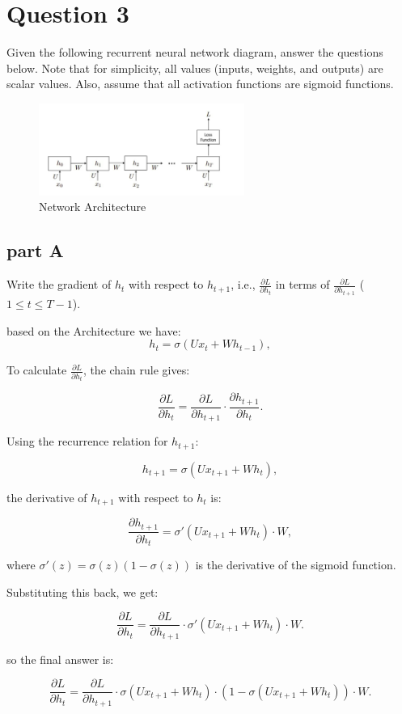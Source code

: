 \section{Question 3}

Given the following recurrent neural network diagram, answer the questions below. Note that for simplicity, all values (inputs, weights, and outputs) are scalar values. Also, assume that all activation functions are sigmoid functions.

\begin{figure}[H]
    \centering
    \includegraphics[width=0.6\textwidth]{Q3.png}
    \caption{Network Architecture}
\end{figure}

\subsection{part A} 
Write the gradient of \( h_t \) with respect to \( h_{t+1} \), i.e., \( \frac{\partial L}{\partial h_t} \) in terms of \( \frac{\partial L}{\partial h_{t+1}} \) (\( 1 \leq t \leq T-1 \)).
\begin{qsolve}
  \begin{qsolve}[]
based on the Architecture we have:
\[
h_t = \sigma(U x_t + W h_{t-1}),
\]

To calculate \( \frac{\partial L}{\partial h_t} \), the chain rule gives:

\[
\frac{\partial L}{\partial h_t} = \frac{\partial L}{\partial h_{t+1}} \cdot \frac{\partial h_{t+1}}{\partial h_t}.
\]

Using the recurrence relation for \( h_{t+1} \):

\[
h_{t+1} = \sigma(U x_{t+1} + W h_t),
\]

the derivative of \( h_{t+1} \) with respect to \( h_t \) is:

\[
\frac{\partial h_{t+1}}{\partial h_t} = \sigma'(U x_{t+1} + W h_t) \cdot W,
\]

where \( \sigma'(z) = \sigma(z) (1 - \sigma(z)) \) is the derivative of the sigmoid function.

Substituting this back, we get:

\[
\frac{\partial L}{\partial h_t} = \frac{\partial L}{\partial h_{t+1}} \cdot \sigma'(U x_{t+1} + W h_t) \cdot W.
\]

so the final answer is:

\[
\frac{\partial L}{\partial h_t} = \frac{\partial L}{\partial h_{t+1}} \cdot \sigma(U x_{t+1} + W h_t) \cdot (1 - \sigma(U x_{t+1} + W h_t)) \cdot W.
\]
  \end{qsolve}
\end{qsolve}
